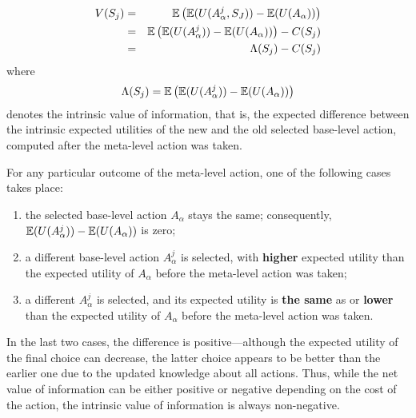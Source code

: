 \begin{eqnarray}
\label{eq:bg-limited-v=bc}
V(S_j)&=&\mathbb{E}\left(\mathbb{E}(U(A_\alpha^j, S_J))-\mathbb{E}(U(A_\alpha))\right)\nonumber\\
     &=&\mathbb{E}\left(\mathbb{E}(U(A_\alpha^j))-\mathbb{E}(U(A_\alpha))\right)-C(S_j)\\
     &=& \Lambda(S_j)-C(S_j)
\end{eqnarray}
where
\begin{equation}
\label{eq:bg-limited-benefit}
\Lambda(S_j)=\mathbb{E}\left(\mathbb{E}(U(A_\alpha^j))-\mathbb{E}(U(A_\alpha))\right)
\end{equation}
denotes the intrinsic value of information, that is, the expected
difference between the intrinsic expected utilities of the new
and the old selected base-level action, computed after the meta-level
action was taken.

For any particular outcome of the meta-level action, one of the
following cases takes place:

\begin{enumerate}
\item the selected base-level action $A_\alpha$ stays the same;
  consequently, $\mathbb{E}(U(A_\alpha^j))-\mathbb{E}(U(A_\alpha))$ is zero;
\item a different base-level action $A_\alpha^j$ is selected, with
  {\bf higher} expected utility than the expected utility of
  $A_\alpha$ before the meta-level action was taken;
\item a different $A_\alpha^j$ is selected, and its expected
  utility is {\bf the same} as or {\bf lower} than the expected
  utility of $A_\alpha$ before the meta-level action was taken.
\end{enumerate}

In the last two cases, the difference is positive---although the
expected utility of the final choice can decrease, the latter
choice appears to be better than the earlier one due
to the updated knowledge about all actions. Thus, while the
net value of information can be either positive or negative depending on
the cost of the action, the intrinsic value of information is always
non-negative.

